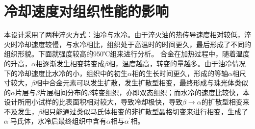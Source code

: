 \section{冷却速度对组织性能的影响}
本设计采用了两种淬火方式：油冷与水冷。由于淬火油的热传导速度相对较低，淬火时冷却速度较慢，与水冷相比，组织处于高温时的时间更久，最后形成了不同的组织形貌。下面就强度较高的950℃组来进行分析。
合金在加热过程中，随着温度的升高，$\alpha$相逐渐发生相变转变成$\beta$相，温度越高，转变的量越多。由于油冷情况下的冷却速度比水冷的小，组织中的初生$\alpha $相的生长时间更久，形成的等轴$\alpha $相尺寸较大，$\beta $相中合金元素可以发生扩散，发生扩散型相变，最终形成与珠光体类似的$\alpha $片层与$\beta $片层相间分布的$\beta $转变组织，亦即双态组织；而水冷的速度比较快，本设计所用小试样的比表面积相对较大，导致冷却极快，导致$\beta \to\alpha $的扩散型相变来不及发生，$\beta $相只能通过类似马氏体相变的非扩散型晶格切变来进行相变，生成了$\alpha^{\prime}$马氏体，水冷后最终组织中含有$\alpha $相与$\alpha^{\prime} $相。

